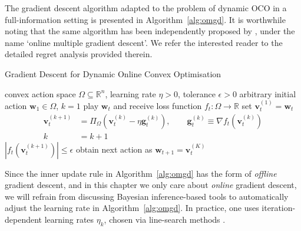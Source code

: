 \begin{mccorrection}
The gradient descent algorithm adapted to the problem of dynamic OCO in a full-information setting is presented in Algorithm~\ref{alg:omgd}. It is worthwhile noting that the same algorithm has been independently proposed by \citet{zhang17}, under the name `online multiple gradient descent'. We refer the interested reader to the detailed regret analysis provided therein.
\begin{algorithm}[H]
\caption{Gradient Descent for Dynamic Online Convex Optimisation}
\label{alg:omgd}
\begin{algorithmic}[1]
	 convex action space $\Omega \subseteq \mathbb{R}^n$, learning rate $\eta > 0$, tolerance $\epsilon > 0$
	 arbitrary initial action $\mathbf{w}_1 \in \Omega$, $k = 1$
		\STATE play $\mathbf{w}_t$ and receive loss function $f_t : \Omega \rightarrow \mathbb{R}$
		\STATE set $\mathbf{v}_t^{(1)} = \mathbf{w}_t$
			\begin{align*}
				\mathbf{v}_t^{(k+1)}
				&= \Pi_{\Omega}(\mathbf{v}_t^{(k)} - \eta\mathbf{g}_t^{(k)}),
				\qquad \mathbf{g}_t^{(k)} \equiv \nabla f_t(\mathbf{v}_t^{(k)})
				\\
				k &= k + 1
			\end{align*}
		 $|f_t(\mathbf{v}_t^{(k+1)})| \leq \epsilon$
		\STATE obtain next action as $\mathbf{w}_{t+1} = \mathbf{v}_t^{(K)}$
	\ENDFOR
\end{algorithmic}
\end{algorithm}
Since the inner update rule in Algorithm~\ref{alg:omgd} has the form of \emph{offline} gradient descent, and in this chapter we only care about \emph{online} gradient descent, we will refrain from discussing Bayesian inference-based tools to automatically adjust the learning rate in Algorithm~\ref{alg:omgd}. In practice, one uses iteration-dependent learning rates $\eta_k$, chosen via line-search methods \citep{nocedal}.
\end{mccorrection}


